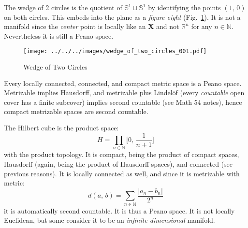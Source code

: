 \documentclass{article}
\theoremstyle{plain}
\theoremstyle{normal}
\newenvironment{example}{%
    \pushQED{\qed}\renewcommand{\qedsymbol}{$\blacksquare$}\examplex%
}{%
    \popQED\endexamplex%
}
\begin{document}
        \begin{example}
            The wedge of 2 circles is the quotient of
            $\mathbb{S}^{1}\sqcup\mathbb{S}^{1}$ by identifying the points
            $(1,\,0)$ on both circles. This embeds into the plane as a
            \textit{figure eight} (Fig.~\ref{fig:wedge_of_two_circles_001}).
            It is not a manifold since the \textit{center} point is locally
            like an \textbf{X} and not $\mathbb{R}^{n}$ for any
            $n\in\mathbb{N}$. Nevertheless it is still a Peano space.
        \end{example}
        \begin{figure}
            \centering
            \texttt{[image: ../../../images/wedge\_of\_two\_circles\_001.pdf]}
            \caption{Wedge of Two Circles}
            \label{fig:wedge_of_two_circles_001}
        \end{figure}
        \begin{example}
            Every locally connected, connected, and compact metric space is a
            Peano space. Metrizable implies Hausdorff, and
            metrizable plus Lindel\"{o}f (every \textit{countable} open cover
            has a finite subcover) implies second countable (see Math 54 notes),
            hence compact metrizable spaces are second countable.
        \end{example}
        \begin{example}
            The Hilbert cube is the product space:
            \begin{equation}
                H=\prod_{n\in\mathbb{N}}\Big[0,\,\frac{1}{n+1}\Big]
            \end{equation}
            with the product topology. It is compact, being the product of
            compact spaces, Hausdorff (again, being the product of Hausdorff
            spaces), and connected (see previous reasons). It is locally
            connected as well, and since it is metrizable with metric:
            \begin{equation}
                d(a,\,b)=
                \sum_{n\in\mathbb{N}}\frac{|a_{n}-b_{n}|}{2^{n}}
            \end{equation}
            it is automatically second countable. It is thus a Peano
            space. It is not locally Euclidean, but some consider
            it to be an \textit{infinite dimensional} manifold.
        \end{example}
\end{document}
